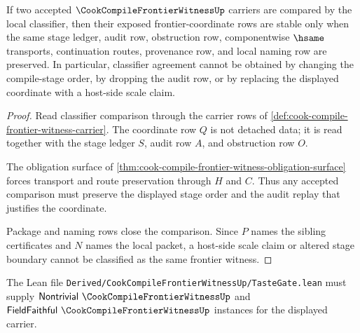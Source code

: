 \begin{theorem}
\label{thm:cook-compile-frontier-coordinate-classifier-stability}
If two accepted $\CookCompileFrontierWitnessUp$ carriers are compared by the local classifier, then their exposed frontier-coordinate rows are stable only when the same stage ledger, audit row, obstruction row, componentwise $\hsame$ transports, continuation routes, provenance row, and local naming row are preserved. In particular, classifier agreement cannot be obtained by changing the compile-stage order, by dropping the audit row, or by replacing the displayed coordinate with a host-side scale claim.
\end{theorem}
\begin{proof}
Read classifier comparison through the carrier rows of \autoref{def:cook-compile-frontier-witness-carrier}. The coordinate row $Q$ is not detached data; it is read together with the stage ledger $S$, audit row $A$, and obstruction row $O$.

The obligation surface of \autoref{thm:cook-compile-frontier-witness-obligation-surface} forces transport and route preservation through $H$ and $C$. Thus any accepted comparison must preserve the displayed stage order and the audit replay that justifies the coordinate.

Package and naming rows close the comparison. Since $P$ names the sibling certificates and $N$ names the local packet, a host-side scale claim or altered stage boundary cannot be classified as the same frontier witness.
\end{proof}

The Lean file \texttt{Derived/CookCompileFrontierWitnessUp/TasteGate.lean} must supply $\mathsf{Nontrivial}\ \CookCompileFrontierWitnessUp$ and $\mathsf{FieldFaithful}\ \CookCompileFrontierWitnessUp$ instances for the displayed carrier.


